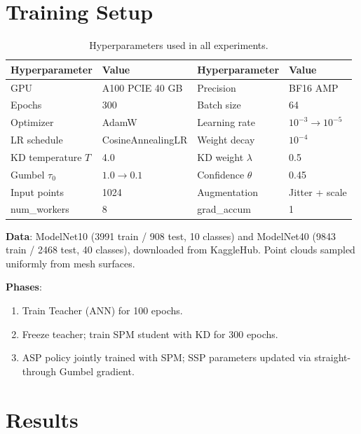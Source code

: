 \documentclass[11pt,a4paper]{article}
\begin{document}
\section{Training Setup}

\begin{table}[H]
\centering
\caption{Hyperparameters used in all experiments.}
\begin{tabular}{L{4cm} L{4cm} L{4cm} L{3cm}}
\toprule
\textbf{Hyperparameter} & \textbf{Value} & \textbf{Hyperparameter} & \textbf{Value} \\
\midrule
GPU & A100 PCIE 40 GB & Precision & BF16 AMP \\
Epochs & 300 & Batch size & 64 \\
Optimizer & AdamW & Learning rate & $10^{-3} \to 10^{-5}$ \\
LR schedule & CosineAnnealingLR & Weight decay & $10^{-4}$ \\
KD temperature $T$ & 4.0 & KD weight $\lambda$ & 0.5 \\
Gumbel $\tau_0$ & $1.0 \to 0.1$ & Confidence $\theta$ & 0.45 \\
Input points & 1024 & Augmentation & Jitter + scale \\
num\_workers & 8 & grad\_accum & 1 \\
\bottomrule
\end{tabular}
\end{table}

\textbf{Data}: ModelNet10 (3991 train / 908 test, 10 classes) and ModelNet40 (9843 train / 2468 test, 40 classes), downloaded from KaggleHub. Point clouds sampled uniformly from mesh surfaces.

\textbf{Phases}:
\begin{enumerate}
  \item Train Teacher (ANN) for 100 epochs.
  \item Freeze teacher; train SPM student with KD for 300 epochs.
  \item ASP policy jointly trained with SPM; SSP parameters updated via straight-through Gumbel gradient.
\end{enumerate}

\section{Results}
\end{document}
